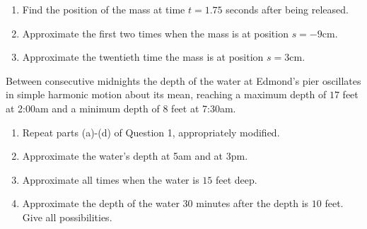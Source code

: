 \documentclass{ximera}
\begin{document}
\begin{question}
\begin{enumerate}
\begin{enumerate}
\item Find the position of the mass at time $t=1.75$ seconds after being released.

\item Approximate the first two times when the mass is at position $s=-9$cm.

\item Approximate the twentieth time the mass is at position $s=3$cm.
\end{enumerate}

\end{enumerate}

\end{question}



\begin{question} \label{Qdlferermm}

Between consecutive midnights the depth of the water at Edmond's pier oscillates in simple harmonic motion about its mean, reaching a maximum depth of $17$ feet at 2:00am and a minimum depth of $8$ feet at 7:30am. 
 
\begin{enumerate}
\item Repeat parts (a)-(d) of Question 1, appropriately modified.

\item Approximate the water's depth at 5am and at 3pm.

\item Approximate all times when the water is $15$ feet deep.

\item Approximate the depth of the water $30$ minutes after the depth is $10$ feet. Give all possibilities.
\end{enumerate}
\end{question}
\end{document}
